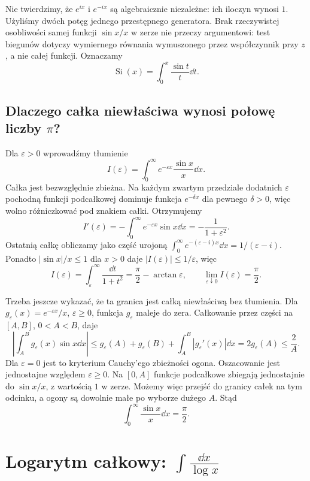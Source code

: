 Nie twierdzimy, że $e^{ix}$ i $e^{-ix}$ są algebraicznie niezależne: ich iloczyn wynosi $1$. Użyliśmy dwóch potęg jednego przestępnego generatora. Brak rzeczywistej osobliwości samej funkcji $\sin x/x$ w zerze nie przeczy argumentowi: test biegunów dotyczy wymiernego równania wymuszonego przez współczynnik przy $z$, a nie całej funkcji. Oznaczamy
\[
\operatorname{Si}(x)=\int_0^x\frac{\sin t}{t}\dd t.
\]

\subsection{Dlaczego całka niewłaściwa wynosi połowę liczby $\pi$?}

Dla $\varepsilon>0$ wprowadźmy tłumienie
\[
I(\varepsilon)=\int_0^\infty e^{-\varepsilon x}\frac{\sin x}{x}\dd x.
\]
Całka jest bezwzględnie zbieżna. Na każdym zwartym przedziale dodatnich $\varepsilon$ pochodną funkcji podcałkowej dominuje funkcja $e^{-\delta x}$ dla pewnego $\delta>0$, więc wolno różniczkować pod znakiem całki. Otrzymujemy
\[
I'(\varepsilon)=-\int_0^\infty e^{-\varepsilon x}\sin x\dd x
=-\frac1{1+\varepsilon^2}.
\]
Ostatnią całkę obliczamy jako część urojoną $\int_0^\infty e^{-(\varepsilon-i)x}\dd x=1/(\varepsilon-i)$. Ponadto $|\sin x|/x\le1$ dla $x>0$ daje $|I(\varepsilon)|\le1/\varepsilon$, więc
\[
I(\varepsilon)=\int_\varepsilon^\infty\frac{\dd t}{1+t^2}
=\frac\pi2-\arctan\varepsilon,
\qquad\lim_{\varepsilon\downarrow0}I(\varepsilon)=\frac\pi2.
\]

Trzeba jeszcze wykazać, że ta granica jest całką niewłaściwą bez tłumienia. Dla $g_\varepsilon(x)=e^{-\varepsilon x}/x$, $\varepsilon\ge0$, funkcja $g_\varepsilon$ maleje do zera. Całkowanie przez części na $[A,B]$, $0<A<B$, daje
\[
\left|\int_A^B g_\varepsilon(x)\sin x\dd x\right|
\le g_\varepsilon(A)+g_\varepsilon(B)
+\int_A^B|g_\varepsilon'(x)|\dd x
=2g_\varepsilon(A)\le\frac2A.
\]
Dla $\varepsilon=0$ jest to kryterium Cauchy'ego zbieżności ogona. Oszacowanie jest jednostajne względem $\varepsilon\ge0$. Na $[0,A]$ funkcje podcałkowe zbiegają jednostajnie do $\sin x/x$, z wartością $1$ w zerze. Możemy więc przejść do granicy całek na tym odcinku, a ogony są dowolnie małe po wyborze dużego $A$. Stąd
\[
\int_0^\infty\frac{\sin x}{x}\dd x=\frac\pi2.
\]

\section{Logarytm całkowy: $\int \frac{\dd x}{\log x}$}

